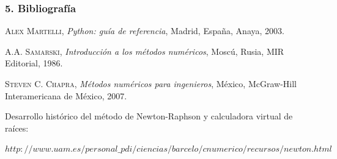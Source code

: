 \documentclass{beamer}
\begin{document}

\begin{frame}
  \frametitle{5. Bibliografía}

  \begin{thebibliography}{10}

    \beamertemplatebookbibitems
       \textsc{Alex Martelli}, \textit{Python: guía de referencia}, 
        Madrid, España, Anaya, 2003. 

    \beamertemplatebookbibitems
       \textsc{A.A. Samarski}, \textit{Introducción a los métodos numéricos}, 
        Moscú, Rusia, MIR Editorial, 1986.

    \beamertemplatebookbibitems
       \textsc{Steven C. Chapra}, \textit{Métodos numéricos para ingenieros}, 
        México, McGraw-Hill Interamericana de México, 2007.

    \beamertemplatebookbibitems
       Desarrollo histórico del método de Newton-Raphson y calculadora virtual de raíces:
       \begin{center}
       \scriptsize
          $http://www.uam.es/personal\_pdi/ciencias/barcelo/cnumerico/recursos/newton.html$
       \end{center}

  \end{thebibliography}
\end{frame}


\end{document}
